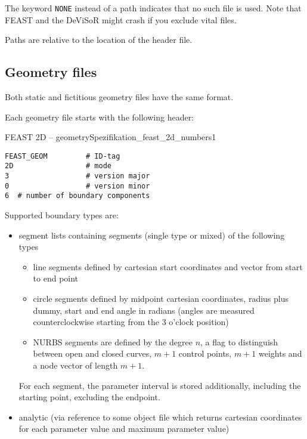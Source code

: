 The keyword \texttt{NONE} instead of a path indicates that no such file is used. Note that FEAST and the DeViSoR might crash if you exclude 
vital files.

Paths are relative to the location of the header file. 




\subsection*{Geometry files}

Both static and fictitious geometry files have the same format.

Each geometry file starts with the following header:

\begin{code}{FEAST 2D -- geometry}{Spezifikation_feast_2d_numbers1}
\begin{verbatim}
FEAST_GEOM         # ID-tag
2D                 # mode
3                  # version major
0                  # version minor
6  # number of boundary components
\end{verbatim}
\end{code}

Supported boundary types are: 
\begin{itemize}
\item segment lists containing segments (single type or mixed) of the following types
\begin{itemize}
\item line segments defined by cartesian start coordinates and vector from start to end point
\item circle segments defined by midpoint cartesian coordinates, radius plus dummy, start and end angle in radians 
(angles are measured counterclockwise starting from the 3 o'clock position)
\item NURBS segments are defined by the degree $n$, a flag to distinguish between open and closed curves, $m+1$ control 
points, $m+1$ weights and a node vector of length $m+1$.
\end{itemize}
For each segment, the parameter interval is stored additionally, including the starting point, excluding the endpoint.
\item analytic (via reference to some object file which returns cartesian coordinates for each parameter value and maximum parameter value)
\end{itemize}

